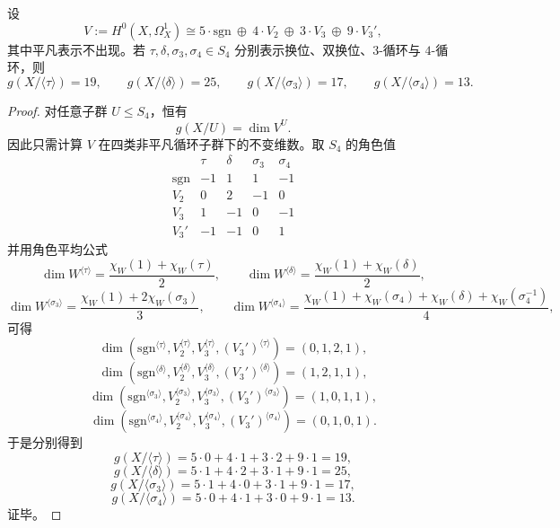 \begin{conclusion}\label{con:xi-time-part9n-s4-cyclic-quotient-genus-spectrum}
设
\[
V:=H^0(X,\Omega_X^1)
\cong
5\cdot \mathrm{sgn}\ \oplus\ 4\cdot V_2\ \oplus\ 3\cdot V_3\ \oplus\ 9\cdot V_3',
\]
其中平凡表示不出现。若 \(\tau,\delta,\sigma_3,\sigma_4\in S_4\) 分别表示换位、双换位、\(3\)-循环与 \(4\)-循环，则
\[
g(X/\langle \tau\rangle)=19,\qquad
g(X/\langle \delta\rangle)=25,\qquad
g(X/\langle \sigma_3\rangle)=17,\qquad
g(X/\langle \sigma_4\rangle)=13.
\]
\end{conclusion}
\begin{proof}
对任意子群 \(U\le S_4\)，恒有
\[
g(X/U)=\dim V^U.
\]
因此只需计算 \(V\) 在四类非平凡循环子群下的不变维数。取 \(S_4\) 的角色值
\[
\begin{array}{c|cccc}
 & \tau & \delta & \sigma_3 & \sigma_4\\
\hline
\mathrm{sgn} & -1 & 1 & 1 & -1\\
V_2 & 0 & 2 & -1 & 0\\
V_3 & 1 & -1 & 0 & -1\\
V_3' & -1 & -1 & 0 & 1
\end{array}
\]
并用角色平均公式
\[
\dim W^{\langle \tau\rangle}=\frac{\chi_W(1)+\chi_W(\tau)}{2},\qquad
\dim W^{\langle \delta\rangle}=\frac{\chi_W(1)+\chi_W(\delta)}{2},
\]
\[
\dim W^{\langle \sigma_3\rangle}=\frac{\chi_W(1)+2\chi_W(\sigma_3)}{3},\qquad
\dim W^{\langle \sigma_4\rangle}=\frac{\chi_W(1)+\chi_W(\sigma_4)+\chi_W(\delta)+\chi_W(\sigma_4^{-1})}{4},
\]
可得
\[
\dim(\mathrm{sgn}^{\langle\tau\rangle},V_2^{\langle\tau\rangle},V_3^{\langle\tau\rangle},(V_3')^{\langle\tau\rangle})
=(0,1,2,1),
\]
\[
\dim(\mathrm{sgn}^{\langle\delta\rangle},V_2^{\langle\delta\rangle},V_3^{\langle\delta\rangle},(V_3')^{\langle\delta\rangle})
=(1,2,1,1),
\]
\[
\dim(\mathrm{sgn}^{\langle\sigma_3\rangle},V_2^{\langle\sigma_3\rangle},V_3^{\langle\sigma_3\rangle},(V_3')^{\langle\sigma_3\rangle})
=(1,0,1,1),
\]
\[
\dim(\mathrm{sgn}^{\langle\sigma_4\rangle},V_2^{\langle\sigma_4\rangle},V_3^{\langle\sigma_4\rangle},(V_3')^{\langle\sigma_4\rangle})
=(0,1,0,1).
\]
于是分别得到
\[
g(X/\langle \tau\rangle)=5\cdot0+4\cdot1+3\cdot2+9\cdot1=19,
\]
\[
g(X/\langle \delta\rangle)=5\cdot1+4\cdot2+3\cdot1+9\cdot1=25,
\]
\[
g(X/\langle \sigma_3\rangle)=5\cdot1+4\cdot0+3\cdot1+9\cdot1=17,
\]
\[
g(X/\langle \sigma_4\rangle)=5\cdot0+4\cdot1+3\cdot0+9\cdot1=13.
\]
证毕。
\end{proof}

